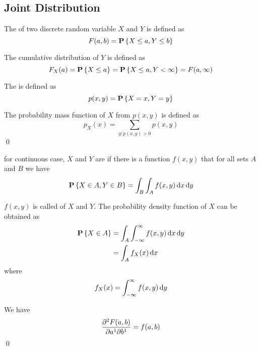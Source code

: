 \subsection{Joint Distribution}

\begin{definition}
    The  of two discrete random variable $X$ and $Y$ is defined as
    \begin{equation}
        F(a,b) = \mathop{\bf P\/}\displaystyle \left\{ X \leq a, Y \leq b \right\}
    \end{equation}
    
    The cumulative distribution of $Y$ is defined as
    \begin{equation}
        F_X(a) = \mathop{\bf P\/}\displaystyle \left\{X \leq a \right\} =\mathop{\bf P\/}\displaystyle \left\{X \leq a, Y < \infty \right\} = F(a, \infty)
    \end{equation}
    
    The  is defined as 
    \begin{equation}
        p(x,y) =\mathop{\bf P\/}\displaystyle \left\{X = x, Y = y\right\}
    \end{equation}
    
    The probability mass function of $X$ from $p(x,y)$ is defined as
    \begin{equation}
        p_X(x) = \displaystyle \sum_{y: p(x,y) > 0} p(x,y)
    \end{equation}
    \qed
\end{definition}


\begin{definition}
    for continuous case, $X$ and $Y$ are  if there is a function $f(x,y)$ that for all sets $A$ and $B$ we have 
\begin{equation}
    \probability{X \in A, Y \in B} = \int_B \int_A f(x,y) \dif{x} \dif{y}
\end{equation}

$f(x,y)$ is called  of $X$ and $Y$. The probability density function of $X$ can be obtained as
\begin{equation}
    \begin{aligned}
        \probability{X \in A} &= \int_A \int_{-\infty}^\infty f(x,y) \dif{x} \dif{y} \\
        &= \int_A f_X (x) \dif{x}
    \end{aligned}
\end{equation}
where
\begin{equation}
     f_X(x) = \int_{-\infty}^\infty f(x,y) \dif{y}
\end{equation}

We have 
\begin{equation}
    \dmd{F(a,b)}{2}{a}{1}{b}{1} = f(a,b)
\end{equation}
\qed
\end{definition}

